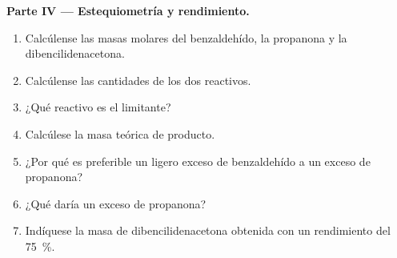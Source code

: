\begin{problem}
\medskip
\noindent\textbf{Parte IV --- Estequiometría y rendimiento.}
\begin{enumerate}[resume]
  \item Calcúlense las masas molares del benzaldehído, la propanona y la dibencilidenacetona.
  \item Calcúlense las cantidades de los dos reactivos.
  \item ¿Qué reactivo es el limitante?
  \item Calcúlese la masa teórica de producto.
  \item ¿Por qué es preferible un ligero exceso de benzaldehído a un exceso de propanona?
  \item ¿Qué daría un exceso de propanona?
  \item Indíquese la masa de dibencilidenacetona obtenida con un rendimiento del 75~\%.
\end{enumerate}
\end{problem}
